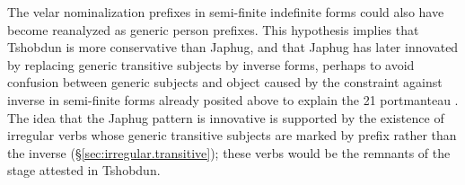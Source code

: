 The velar nominalization prefixes in semi-finite indefinite forms could also have become reanalyzed as generic person prefixes. This hypothesis implies that Tshobdun is more conservative than Japhug, and that Japhug has later innovated by replacing generic transitive subjects by inverse forms,  perhaps to avoid confusion between generic subjects and object caused by the constraint against inverse in semi-finite forms already posited above to explain the 2\fl{}1 portmanteau . The idea that the Japhug pattern is innovative is supported by the existence of irregular verbs whose generic transitive subjects are marked by  prefix rather than the inverse (§\ref{sec:irregular.transitive}); these verbs would be the remnants of the stage attested in Tshobdun.
 
 

